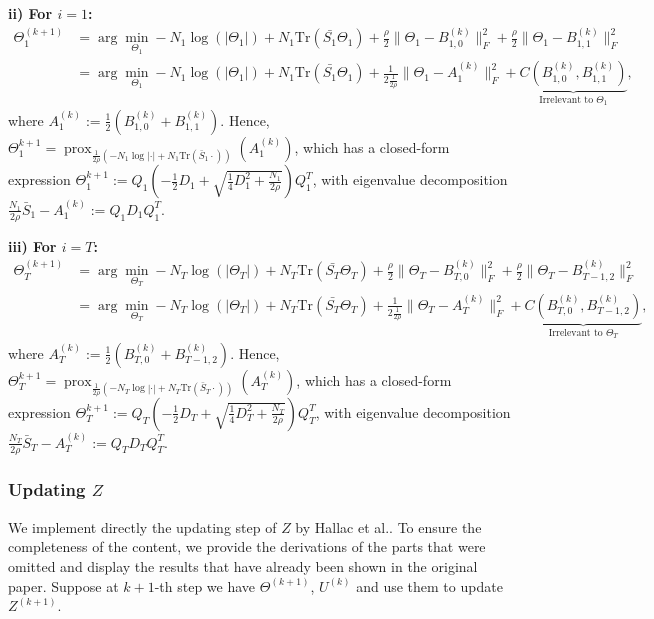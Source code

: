 \vspace{1cm}
\textbf{ii) For $i=1$:} 
\begin{align*}
    \Theta_1^{(k+1)}&=\arg\min_{\Theta_1}-N_1\log(|\Theta_1|)+N_1\text{Tr}(\bar{S_1}\Theta_1)+\frac{\rho}{2}\|\Theta_1-B_{1,0}^{(k)}\|_F^2+\frac{\rho}{2}\|\Theta_1-B_{1,1}^{(k)}\|_F^2 \\
                    &=\arg\min_{\Theta_1}-N_1\log(|\Theta_1|)+N_1\text{Tr}(\bar{S_1}\Theta_1)+\frac{1}{2\frac{1}{2\rho}}\|\Theta_1-A_1^{(k)}\|_F^2 + \underbrace{C(B_{1,0}^{(k)},B_{1,1}^{(k)})}_{\text{Irrelevant to }\Theta_1}, 
\end{align*}
where $A_1^{(k)}:=\frac{1}{2}(B_{1,0}^{(k)}+B_{1,1}^{(k)})$. 
Hence, $\Theta_1^{k+1}=\operatorname{prox}_{\frac{1}{2\rho}(-N_1\log|\cdot|+N_1\text{Tr}(\bar{S}_1\cdot))}(A_1^{(k)})$, 
which has a closed-form expression $\Theta_1^{k+1}:=Q_1(-\frac{1}{2}D_1+\sqrt{\frac{1}{4}D_1^2+\frac{N_1}{2\rho}})Q_1^T$, 
with eigenvalue decomposition $\frac{N_1}{2\rho}\bar{S}_1-A_1^{(k)}:=Q_1D_1Q_1^T$.

\vspace{1cm}
\textbf{iii) For $i=T$:}
\begin{align*}
    \Theta_T^{(k+1)}&=\arg\min_{\Theta_T}-N_T\log(|\Theta_T|)+N_T\text{Tr}(\bar{S_T}\Theta_T)+\frac{\rho}{2}\|\Theta_T-B_{T,0}^{(k)}\|_F^2+\frac{\rho}{2}\|\Theta_T-B_{T-1,2}^{(k)}\|_F^2 \\
                    &=\arg\min_{\Theta_T}-N_T\log(|\Theta_T|)+N_T\text{Tr}(\bar{S_T}\Theta_T)+\frac{1}{2\frac{1}{2\rho}}\|\Theta_T-A_T^{(k)}\|_F^2+\underbrace{C(B_{T,0}^{(k)},B_{T-1,2}^{(k)})}_{\text{Irrelevant to }\Theta_T},
\end{align*}
where $A_T^{(k)}:=\frac{1}{2}(B_{T,0}^{(k)}+B_{T-1,2}^{(k)})$. 
Hence, $\Theta_T^{k+1}=\operatorname{prox}_{\frac{1}{2\rho}(-N_T\log|\cdot|+N_T\text{Tr}(\bar{S}_T\cdot))}(A_T^{(k)})$, 
which has a closed-form expression $\Theta_T^{k+1}:=Q_T(-\frac{1}{2}D_T+\sqrt{\frac{1}{4}D_T^2+\frac{N_T}{2\rho}})Q_T^T$, 
with eigenvalue decomposition $\frac{N_T}{2\rho}\bar{S}_T-A_T^{(k)}:=Q_TD_TQ_T^T$.

\subsubsection{Updating $Z$}
We implement directly the updating step of $Z$ by Hallac et al.\cite{hallac2017networkinferencetimevaryinggraphical}. 
To ensure the completeness of the content, 
we provide the derivations of the parts that were omitted and display the results that have already been shown in the original paper.
Suppose at $k+1$-th step we have $\Theta^{(k+1)}$, $U^{(k)}$ and use them to update $Z^{(k+1)}$. 

